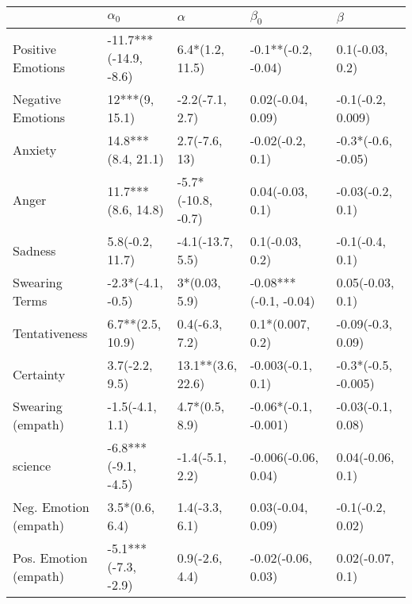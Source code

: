 \begin{tabular}{lllll}
\toprule
{} &             $\alpha_0$ &            $\alpha$ &              $\beta_0$ &              $\beta$ \\
\midrule
Positive Emotions     &  -11.7***(-14.9, -8.6) &     6.4*(1.2, 11.5) &    -0.1**(-0.2, -0.04) &      0.1(-0.03, 0.2) \\
Negative Emotions     &         12***(9, 15.1) &     -2.2(-7.1, 2.7) &      0.02(-0.04, 0.09) &    -0.1(-0.2, 0.009) \\
Anxiety               &     14.8***(8.4, 21.1) &       2.7(-7.6, 13) &       -0.02(-0.2, 0.1) &   -0.3*(-0.6, -0.05) \\
Anger                 &     11.7***(8.6, 14.8) &  -5.7*(-10.8, -0.7) &       0.04(-0.03, 0.1) &     -0.03(-0.2, 0.1) \\
Sadness               &        5.8(-0.2, 11.7) &    -4.1(-13.7, 5.5) &        0.1(-0.03, 0.2) &      -0.1(-0.4, 0.1) \\
Swearing Terms        &      -2.3*(-4.1, -0.5) &       3*(0.03, 5.9) &  -0.08***(-0.1, -0.04) &     0.05(-0.03, 0.1) \\
Tentativeness         &       6.7**(2.5, 10.9) &      0.4(-6.3, 7.2) &       0.1*(0.007, 0.2) &    -0.09(-0.3, 0.09) \\
Certainty             &         3.7(-2.2, 9.5) &   13.1**(3.6, 22.6) &      -0.003(-0.1, 0.1) &  -0.3*(-0.5, -0.005) \\
Swearing (empath)     &        -1.5(-4.1, 1.1) &      4.7*(0.5, 8.9) &   -0.06*(-0.1, -0.001) &    -0.03(-0.1, 0.08) \\
science               &    -6.8***(-9.1, -4.5) &     -1.4(-5.1, 2.2) &    -0.006(-0.06, 0.04) &     0.04(-0.06, 0.1) \\
Neg. Emotion (empath) &         3.5*(0.6, 6.4) &      1.4(-3.3, 6.1) &      0.03(-0.04, 0.09) &     -0.1(-0.2, 0.02) \\
Pos. Emotion (empath) &    -5.1***(-7.3, -2.9) &      0.9(-2.6, 4.4) &     -0.02(-0.06, 0.03) &     0.02(-0.07, 0.1) \\
\bottomrule
\end{tabular}
